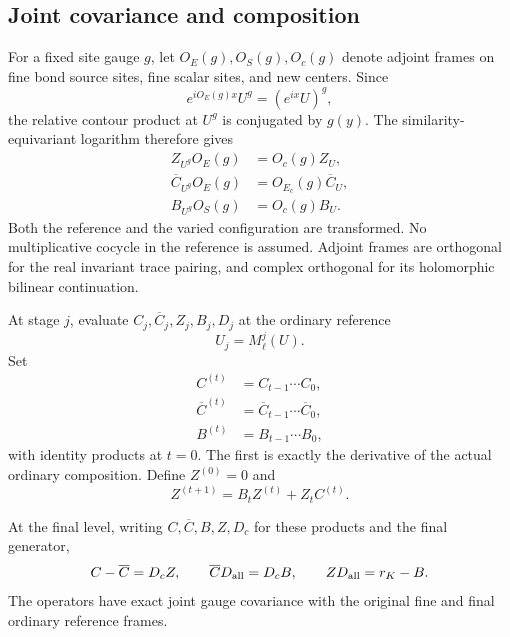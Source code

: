 \subsection{Joint covariance and composition}
\label{ccs-composition-section}

For a fixed site gauge \(g\), let \(O_E(g),O_S(g),O_c(g)\)
denote adjoint frames on fine bond source sites, fine scalar sites,
and new centers. Since
\[
 e^{iO_E(g)x}U^g=(e^{ix}U)^g,
\]
the relative contour product at \(U^g\) is conjugated by \(g(y)\).
The similarity-equivariant logarithm therefore gives
\begin{equation}
 \begin{split}
 Z_{U^g}O_E(g)&=O_c(g)Z_U,\\
 \overline C_{U^g}O_E(g)&=O_{E_c}(g)\overline C_U,\\
 B_{U^g}O_S(g)&=O_c(g)B_U.
 \end{split}
 \label{ccs-primitive-covariance}
\end{equation}
Both the reference and the varied configuration are transformed.
No multiplicative cocycle in the reference is assumed.
Adjoint frames are orthogonal for the real invariant trace pairing,
and complex orthogonal for its holomorphic bilinear continuation.

At stage \(j\), evaluate \(C_j,\overline C_j,Z_j,B_j,D_j\)
at the ordinary reference
\[
                         U_j=M_\ell^j(U).
\]
Set
\begin{equation}
 \begin{split}
 C^{(t)}&=C_{t-1}\cdots C_0,\\
 \overline C^{(t)}&=\overline C_{t-1}\cdots\overline C_0,\\
 B^{(t)}&=B_{t-1}\cdots B_0,
 \end{split}
 \label{ccs-products}
\end{equation}
with identity products at \(t=0\).
The first is exactly the derivative of the actual ordinary
composition. Define \(Z^{(0)}=0\) and
\begin{equation}
        Z^{(t+1)}=B_tZ^{(t)}+Z_tC^{(t)}.
 \label{ccs-Z-recursion}
\end{equation}

\begin{proposition}
\label{ccs-composite-theorem}
At the final level, writing \(C,\overline C,B,Z,D_c\) for these
products and the final generator,
\begin{equation}
 C-\overline C=D_cZ,\qquad
 \overline C D_{\rm all}=D_cB,\qquad
                  ZD_{\rm all}=r_K-B.
 \label{ccs-composite-identities}
\end{equation}
The operators have exact joint gauge covariance with the original
fine and final ordinary reference frames.
\end{proposition}

